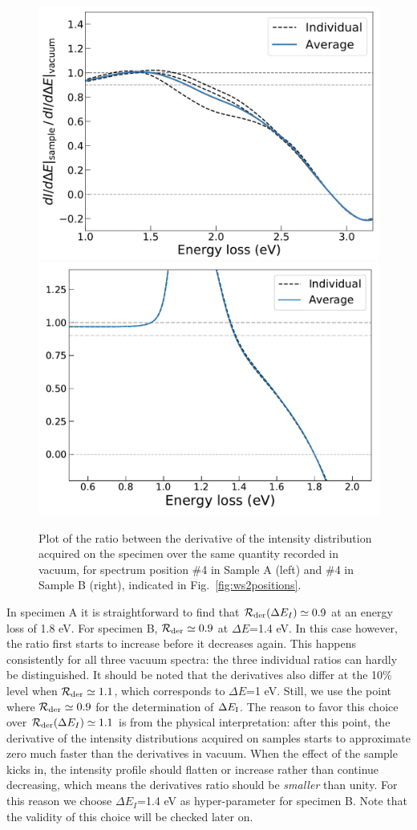 \begin{figure}[H]
\begin{centering}
  \includegraphics[width=0.49\linewidth]{plots/Derivatives_ratio_A.pdf}
  \includegraphics[width=0.49\linewidth]{plots/Derivatives_ratio_B.pdf}
  \caption{Plot of the ratio
between the derivative of the intensity distribution 
acquired on the specimen over the
same quantity recorded in vacuum,
  for spectrum position \#4 in Sample A (left) and \#4 in Sample B (right),
  indicated in Fig.~\ref{fig:ws2positions}.}
\label{fig:rder}
\end{centering}
\end{figure}

In specimen A it is straightforward to find that $\mathcal{R}_{\rm der}(\Delta E_I) \simeq 0.9$
at an energy loss of 1.8 eV. 
%
For specimen B,  $\mathcal{R}_{\rm der} \simeq 0.9$ at $\Delta E$=1.4 eV.
%
In this case however, the ratio first starts to increase before it decreases again. 
%
This happens consistently for all three vacuum spectra: the three individual ratios can hardly
be distinguished. 
%
It should be noted that the derivatives also differ at the 10\% level when 
$\mathcal{R}_{\rm der} \simeq 1.1$, which corresponds to $\Delta E$=1 eV.
%
Still, we use the point where $\mathcal{R}_{\rm der} \simeq 0.9$
for the determination of $\Delta E_{\rm I}$.
%
The reason to favor this choice over $\mathcal{R}_{\rm der}(\Delta E_I) \simeq 1.1$ is from 
the physical interpretation: after this point,
the derivative of the intensity distributions acquired on samples starts 
to approximate zero much faster than the derivatives in vacuum.
%
When the effect of the sample kicks in, the intensity profile should flatten or increase rather than
continue decreasing, which means the derivatives ratio should be {\it smaller} than unity. 
%
For this reason we choose $\Delta E_I$=1.4 eV as hyper-parameter for specimen B. 
Note that the validity of this choice will be checked later on.\\

